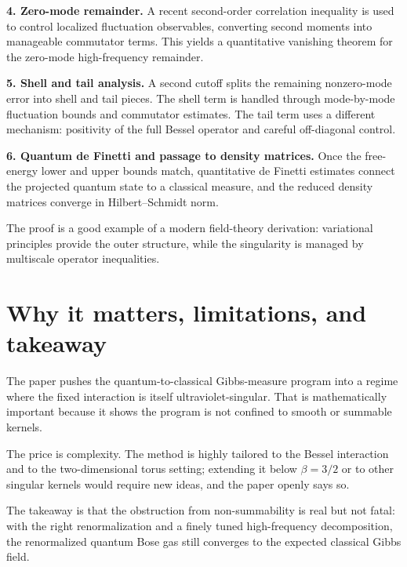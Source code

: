 \documentclass[11pt]{article}
\begin{document}
\textbf{4. Zero-mode remainder.} A recent second-order correlation inequality is used to control localized fluctuation observables, converting second moments into manageable commutator terms. This yields a quantitative vanishing theorem for the zero-mode high-frequency remainder.

\textbf{5. Shell and tail analysis.} A second cutoff splits the remaining nonzero-mode error into shell and tail pieces. The shell term is handled through mode-by-mode fluctuation bounds and commutator estimates. The tail term uses a different mechanism: positivity of the full Bessel operator and careful off-diagonal control.

\textbf{6. Quantum de Finetti and passage to density matrices.} Once the free-energy lower and upper bounds match, quantitative de Finetti estimates connect the projected quantum state to a classical measure, and the reduced density matrices converge in Hilbert--Schmidt norm.

The proof is a good example of a modern field-theory derivation: variational principles provide the outer structure, while the singularity is managed by multiscale operator inequalities.

\section*{Why it matters, limitations, and takeaway}
The paper pushes the quantum-to-classical Gibbs-measure program into a regime where the fixed interaction is itself ultraviolet-singular. That is mathematically important because it shows the program is not confined to smooth or summable kernels.

The price is complexity. The method is highly tailored to the Bessel interaction and to the two-dimensional torus setting; extending it below $\beta=3/2$ or to other singular kernels would require new ideas, and the paper openly says so.

The takeaway is that the obstruction from non-summability is real but not fatal: with the right renormalization and a finely tuned high-frequency decomposition, the renormalized quantum Bose gas still converges to the expected classical Gibbs field.
\end{document}
